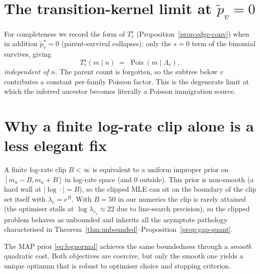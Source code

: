 \documentclass[11pt]{article}
\newcommand{\dup}{\lambda}             %
\newcommand{\survp}{\tilde p}          %
\DeclareMathOperator{\Poi}{Pois}
\theoremstyle{definition}
\begin{document}
\section{The transition-kernel limit at $\survp_v = 0$}

For completeness we record the form of $T^\star_v$
(Proposition~\ref{prop:edge-conv}) when in addition
$\survp_v^\star = 0$ (parent-survival collapses): only the $s=0$ term
of the binomial survives, giving
\begin{equation}
T^\star_v(m \mid n) \;=\; \Poi(m \mid \Lambda_v),
\label{eq:edge-collapsed}
\end{equation}
\emph{independent of $n$}. The parent count is forgotten, so the
subtree below $v$ contributes a constant per-family Poisson factor.
This is the degenerate limit at which the inferred ancestor becomes
literally a Poisson immigration source.

\section{Why a finite log-rate clip alone is a less elegant fix}
\label{app:clip}

A finite log-rate clip $B<\infty$ is equivalent to a uniform improper
prior on $[m_a - B, m_a + B]$ in log-rate space (and $0$ outside).
This prior is non-smooth (a hard wall at $|\log\cdot| = B$), so the
clipped MLE can sit on the boundary of the clip set itself with
$\dup_v = e^B$.  With $B = 50$ in our numerics the clip is rarely
attained (the optimiser stalls at $\log\dup_{v_\star} \approx 22$
due to line-search precision), so the clipped problem behaves as
unbounded and inherits all the asymptote pathology characterised in
Theorem~\ref{thm:unbounded}--Proposition~\ref{prop:gap-quant}.

The MAP prior \eqref{eq:lognormal} achieves the same boundedness
through a \emph{smooth} quadratic cost. Both objectives are coercive,
but only the smooth one yields a unique optimum that is robust to
optimiser choice and stopping criterion.
\end{document}
